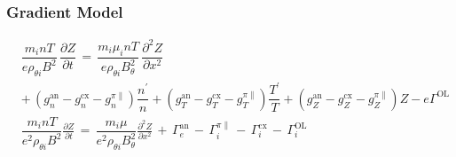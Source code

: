 \documentclass[a4paper,8pt]{article}
\begin{document}
\normalsize

\subsubsection{Gradient Model}\label{gradient-model}

\small

\begin{align}
    \nonumber&\dfrac{m_i n T}{e \rho_{\theta i} B^2} \, \dfrac{\partial Z}{\partial t}
        \,=\, \dfrac{m_i \mu_i n T}{e \rho_{\theta i} B_\theta^2} \, \dfrac{\partial^2 Z}{\partial x^2} \\
    &+\, \left(g_n^\text{an} - g_n^\text{cx} - g_n^{\pi\parallel}\right) \dfrac{n^\prime}{n}
        + \left(g_T^\text{an} - g_T^\text{cx} - g_T^{\pi\parallel}\right) \dfrac{T^\prime}{T}
        + \left(g_Z^\text{an} - g_Z^\text{cx} - g_Z^{\pi\parallel}\right) Z - e\Gamma^\text{OL} \\
    &\dfrac{m_i n T}{e^2 \rho_{\theta i} B^2} \frac{\partial Z}{\partial t}
        \,=\, \dfrac{m_i \mu}{e^2 \rho_{\theta i} B_\theta^2} \frac{\partial^2 Z}{\partial x^2}
        \,+\, \Gamma_e^\text{an} \,-\, \Gamma_i^{\pi\parallel} \,-\, \Gamma_i^\text{cx} \,-\, \Gamma_i^\text{OL}
\end{align}

\normalsize
\end{document}
